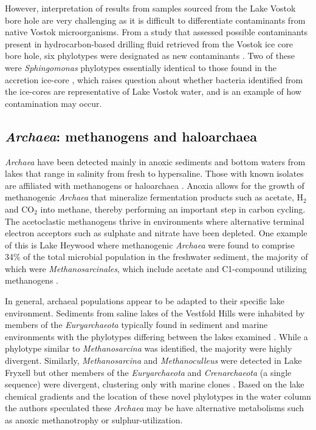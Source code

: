 However, interpretation of results from samples sourced from the Lake Vostok bore hole are very challenging as it is difficult to differentiate contaminants from native Vostok microorganisms.
From a study that assessed possible contaminants present in hydrocarbon-based drilling fluid retrieved from the Vostok ice core bore hole, 
six phylotypes were designated as new contaminants \cite{Alekhina2007}. 
Two of these were \emph{Sphingomonas} phylotypes essentially identical to those found in the accretion ice-core \cite{Christner2001},
 which raises question about whether bacteria identified from the ice-cores are representative of Lake Vostok water,
 and is an example of how contamination may occur.

\subsection{\emph{Archaea}: methanogens and haloarchaea}
\emph{Archaea} have been detected mainly in anoxic sediments and bottom waters from lakes that range in salinity from fresh to hypersaline.
Those with known isolates are affiliated with methanogens or haloarchaea \cite{Bowman2000a, Bowman2000b, Purdy2003, Kurosawa2010, Lauro2011}.
Anoxia allows for the growth of methanogenic \emph{Archaea} that mineralize fermentation products such as acetate, H$_2$ and CO$_2$ into methane, thereby performing an important step in carbon cycling.
The acetoclastic methanogens thrive in environments where alternative terminal electron acceptors such as sulphate and nitrate have been depleted. 
One example of this is Lake Heywood where methanogenic \emph{Archaea} were found to comprise 34\% of the total microbial population in the freshwater sediment, the majority of which were \emph{Methanosarcinales}, which include acetate and C1-compound utilizing methanogens \cite{Purdy2003}. 

In general, archaeal populations appear to be adapted to their specific lake environment.
Sediments from saline lakes of the Vestfold Hills were inhabited by members of the \emph{Euryarchaeota} typically found in sediment and marine environments with the phylotypes differing between the lakes examined \cite{Bowman2000a}. 
While a phylotype similar to \emph{Methanosarcina} was identified, the majority were highly divergent. 
Similarly, \emph{Methanosarcina} and \emph{Methanoculleus} were detected in Lake Fryxell but other members of the \emph{Euryarchaeota} and \emph{Crenarchaeota} (a single sequence) were divergent, clustering only with marine clones \cite{Karr2006}. 
Based on the lake chemical gradients and the location of these novel phylotypes in the water column the authors speculated these \emph{Archaea} may be have alternative metabolisms such as anoxic methanotrophy or sulphur-utilization. 

